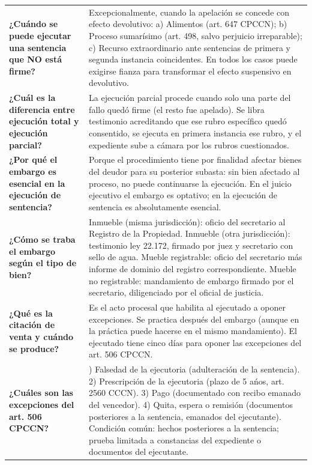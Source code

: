 \documentclass[12pt,oneside]{book}
\begin{document}
\begin{longtable}{
    >{\raggedright\arraybackslash}p{}
    >{\raggedright\arraybackslash}p{}
}
\textbf{¿Cu\'ando se puede ejecutar una sentencia que NO est\'a firme?} &
Excepcionalmente, cuando la apelaci\'on se concede con efecto devolutivo: a) Alimentos (art. 647 CPCCN); b) Proceso sumar\'isimo (art. 498, salvo perjuicio irreparable); c) Recurso extraordinario ante sentencias de primera y segunda instancia coincidentes. En todos los casos puede exigirse fianza para transformar el efecto suspensivo en devolutivo. \\

\textbf{¿Cu\'al es la diferencia entre ejecuci\'on total y ejecuci\'on parcial?} &
La ejecuci\'on parcial procede cuando solo una parte del fallo qued\'o firme (el resto fue apelado). Se libra testimonio acreditando que ese rubro espec\'ifico qued\'o consentido, se ejecuta en primera instancia ese rubro, y el expediente sube a c\'amara por los rubros cuestionados. \\

\textbf{¿Por qu\'e el embargo es esencial en la ejecuci\'on de sentencia?} &
Porque el procedimiento tiene por finalidad afectar bienes del deudor para su posterior subasta: sin bien afectado al proceso, no puede continuarse la ejecuci\'on. En el juicio ejecutivo el embargo es optativo; en la ejecuci\'on de sentencia es absolutamente esencial. \\

\textbf{¿C\'omo se traba el embargo seg\'un el tipo de bien?} &
Inmueble (misma jurisdicci\'on): oficio del secretario al Registro de la Propiedad. Inmueble (otra jurisdicci\'on): testimonio ley 22.172, firmado por juez y secretario con sello de agua. Mueble registrable: oficio del secretario m\'as informe de dominio del registro correspondiente. Mueble no registrable: mandamiento de embargo firmado por el secretario, diligenciado por el oficial de justicia. \\

\textbf{¿Qu\'e es la citaci\'on de venta y cu\'ando se produce?} &
Es el acto procesal que habilita al ejecutado a oponer excepciones. Se practica despu\'es del embargo (aunque en la pr\'actica puede hacerse en el mismo mandamiento). El ejecutado tiene cinco d\'ias para oponer las excepciones del art. 506 CPCCN. \\

\textbf{¿Cu\'ales son las excepciones del art. 506 CPCCN?} &
1) Falsedad de la ejecutoria (adulteraci\'on de la sentencia). 2) Prescripci\'on de la ejecutoria (plazo de 5 a\'nos, art. 2560 CCCN). 3) Pago (documentado con recibo emanado del vencedor). 4) Quita, espera o remisi\'on (documentos posteriores a la sentencia, emanados del ejecutante). Condici\'on com\'un: hechos posteriores a la sentencia; prueba limitada a constancias del expediente o documentos del ejecutante. \\


\end{longtable}
\end{document}
